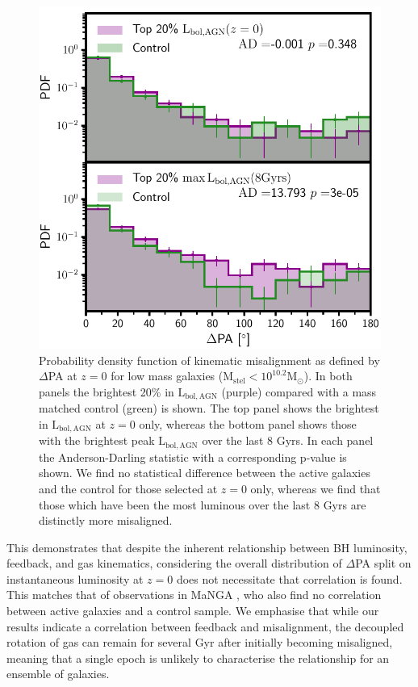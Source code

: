 \begin{figure}
    \centering
	\includegraphics[width=0.9\linewidth]{misalignment_BH/PA_distribution_low_mass_z0_max_comparison.pdf}
    \caption{Probability density function of kinematic misalignment as defined by $\Delta$PA at $z=0$ for low mass galaxies ($\mathrm{M_{stel} < 10^{10.2}M_{\odot}}$). In both panels the brightest 20\% in $\mathrm{L_{bol,AGN}}$ (purple) compared with a mass matched control (green) is shown. The top panel shows the brightest in $\mathrm{L_{bol,AGN}}$ at $z=0$ only, whereas the bottom panel shows those with the brightest peak $\mathrm{L_{bol, AGN}}$ over the last 8 Gyrs. In each panel the Anderson-Darling statistic with a corresponding p-value is shown. We find no statistical difference between the active galaxies and the control for those selected at $z=0$ only, whereas we find that those which have been the most luminous over the last 8 Gyrs are distinctly more misaligned.}
    \label{fig:PAdist}
\end{figure}

This demonstrates that despite the inherent relationship between BH luminosity, feedback, and gas kinematics, considering the overall distribution of $\Delta$PA split on instantaneous luminosity at $z=0$ does not necessitate that correlation is found. This matches that of observations in MaNGA \citep[Figure 6 in][]{ilha2019}, who also find no correlation between active galaxies and a control sample. We emphasise that while our results indicate a correlation between feedback and misalignment, the decoupled rotation of gas can remain for several Gyr after initially becoming misaligned, meaning that a single epoch is unlikely to characterise the relationship for an ensemble of galaxies.

